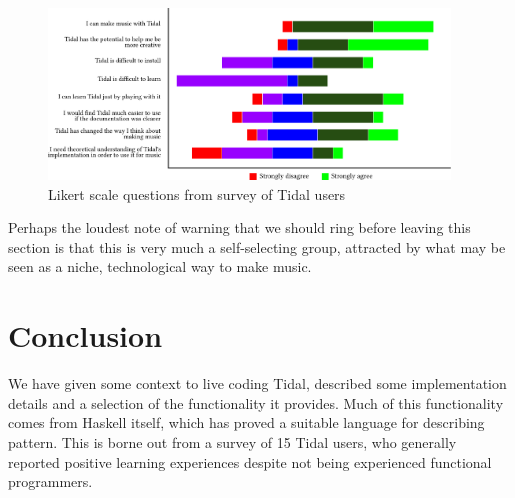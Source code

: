 \documentclass[authoryear]{sigplanconf}
\begin{document}
\begin{figure}[t]
    \centering
    \includegraphics[width=0.95\textwidth]{images/graph.pdf}
    \caption{Likert scale questions from survey of Tidal users}
    \label{fig:likert}
\end{figure}

Perhaps the loudest note of warning that we should ring before leaving
this section is that this is very much a self-selecting group,
attracted by what may be seen as a niche, technological way to make
music.

\section{Conclusion}

We have given some context to live coding Tidal, described some
implementation details and a selection of the functionality it
provides. Much of this functionality comes from Haskell itself, which
has proved a suitable language for describing pattern. This is borne
out from a survey of 15 Tidal users, who generally reported positive
learning experiences despite not being experienced functional
programmers.

\newpage





\end{document}
